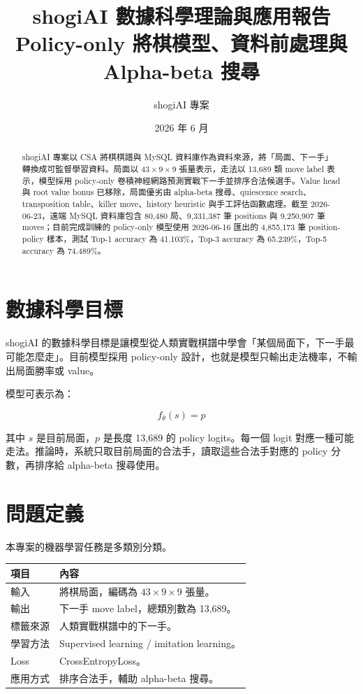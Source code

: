 \documentclass[12pt,a4paper,fontset=none]{ctexart}
\title{\textbf{shogiAI 數據科學理論與應用報告}\\
\large Policy-only 將棋模型、資料前處理與 Alpha-beta 搜尋}
\author{shogiAI 專案}
\date{2026 年 6 月}
\begin{document}
\maketitle

\begin{abstract}
shogiAI 專案以 CSA 將棋棋譜與 MySQL 資料庫作為資料來源，將「局面、下一手」轉換成可監督學習資料。局面以 $43 \times 9 \times 9$ 張量表示，走法以 13,689 類 move label 表示，模型採用 policy-only 卷積神經網路預測實戰下一手並排序合法候選手。Value head 與 root value bonus 已移除，局面優劣由 alpha-beta 搜尋、quiescence search、transposition table、killer move、history heuristic 與手工評估函數處理。截至 2026-06-23，遠端 MySQL 資料庫包含 80,480 局、9,331,387 筆 positions 與 9,250,907 筆 moves；目前完成訓練的 policy-only 模型使用 2026-06-16 匯出的 4,855,173 筆 position-policy 樣本，測試 Top-1 accuracy 為 41.103\%，Top-3 accuracy 為 65.239\%，Top-5 accuracy 為 74.489\%。
\end{abstract}

\tableofcontents
\newpage

\section{數據科學目標}

shogiAI 的數據科學目標是讓模型從人類實戰棋譜中學會「某個局面下，下一手最可能怎麼走」。目前模型採用 policy-only 設計，也就是模型只輸出走法機率，不輸出局面勝率或 value。

模型可表示為：

\[
f_\theta(s) = p
\]

其中 $s$ 是目前局面，$p$ 是長度 13,689 的 policy logits。每一個 logit 對應一種可能走法。推論時，系統只取目前局面的合法手，讀取這些合法手對應的 policy 分數，再排序給 alpha-beta 搜尋使用。

\section{問題定義}

本專案的機器學習任務是多類別分類。

\begin{longtable}{p{}p{}}
\toprule
\textbf{項目} & \textbf{內容}\\
\midrule
\endhead
輸入 & 將棋局面，編碼為 $43 \times 9 \times 9$ 張量。\\
輸出 & 下一手 move label，總類別數為 13,689。\\
標籤來源 & 人類實戰棋譜中的下一手。\\
學習方法 & Supervised learning / imitation learning。\\
Loss & CrossEntropyLoss。\\
應用方式 & 排序合法手，輔助 alpha-beta 搜尋。\\
\bottomrule
\end{longtable}
\end{document}
